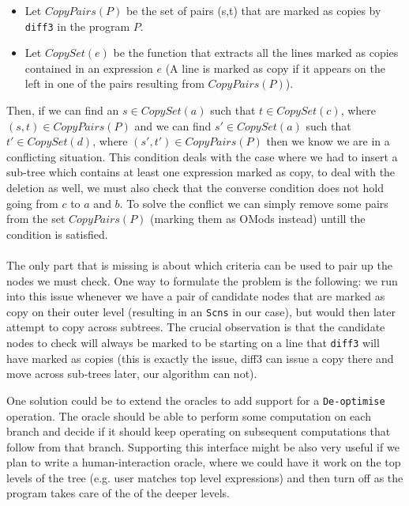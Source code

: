 \documentclass[11pt]{article}
\begin{document}
\begin{itemize}
  \item Let $CopyPairs(P)$ be the set of pairs (s,t) that are marked as copies by 
\texttt{diff3} in the program $P$.

\item Let $CopySet(e)$ be the function that extracts all the lines marked as copies 
contained in an expression $e$ (A line is marked as copy if it appears on the left in one of the pairs resulting from $CopyPairs(P)$).
\end{itemize}

Then, if we can find an $s \in CopySet(a)$ such that $t \in CopySet(c)$, where $(s,t) \in 
CopyPairs(P)$ and we can find $s' \in CopySet(a)$ such that $t' \in CopySet(d)$, where $(s',t') \in 
CopyPairs(P)$ then we know we are in a conflicting situation. 
This condition deals with the case where we had to insert a sub-tree which 
contains at least one expression marked as copy, to deal with the deletion as well, we 
must also check that the converse condition does not hold going from $c$ to $a$ 
and $b$.
To solve the conflict we can simply remove some pairs from the set $CopyPairs(P)$ (marking them as OMods instead)
untill the condition is satisfied. 
\\\\

The only part that is missing is about which criteria can be used to pair up the 
nodes we must check. One way to formulate the problem is the following: we run 
into this issue whenever we have a pair of candidate nodes that are marked as copy on 
their outer level (resulting in an \texttt{Scns} in our case), but would then later attempt to copy across 
subtrees.  The crucial observation is that the candidate nodes to check will 
always be marked to be starting on a line that \texttt{diff3} will have marked 
as copies (this is exactly the issue, diff3 can issue a copy there and move across sub-trees later, our algorithm can 
not).

One solution could be to extend the oracles to add support for a \texttt{De-optimise} 
operation. The oracle should be able to perform some computation on each branch 
and decide if it should keep operating on subsequent computations that follow from that branch. 
Supporting this interface might be also very useful if we plan to write a human-interaction oracle, where we could have 
it work on the top levels of the tree (e.g. user matches top level expressions) 
and then turn off as the program takes care of the of the deeper levels. 
\end{document}
